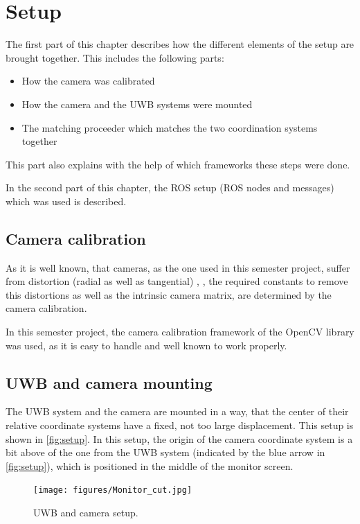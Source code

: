 
\setcounter{chapter}{2}

\chapter{Setup}\label{ch:setup}
The first part of this chapter describes how the different elements of the setup are brought together. This includes the following parts:
\begin{itemize}
	\item How the camera was calibrated
	\item How the camera and the \ac{UWB} systems were mounted
	\item The matching proceeder which matches the two coordination systems together
\end{itemize}
This part also explains with the help of which frameworks these steps were done.

In the second part of this chapter, the \ac{ROS} setup (\ac{ROS} nodes and messages) which was used is described. 

\section{Camera calibration}
As it is well known, that cameras, as the one used in this semester project, suffer from distortion (radial as well as tangential) \cite{Szeliski:2010:CVA:1941882}, \cite{opencv_library}, the required constants to remove this distortions as well as the intrinsic camera matrix, are determined by the camera calibration.

In this semester project, the camera calibration framework of the OpenCV library \cite{opencv_library} was used, as it is easy to handle and well known to work properly.

\section{\ac{UWB} and camera mounting}
The \ac{UWB} system and the camera are mounted in a way, that the center of their relative coordinate systems have a fixed, not too large displacement. This setup is shown in \autoref{fig:setup}. In this setup, the origin of the camera coordinate system is a bit above of the one from the \ac{UWB} system (indicated by the blue arrow in \autoref{fig:setup}), which is positioned in the middle of the monitor screen. 

\begin{figure}[h]\centering
	\texttt{[image: figures/Monitor\_cut.jpg]}
	\caption{\ac{UWB} and camera setup.}\label{fig:setup}
\end{figure}

